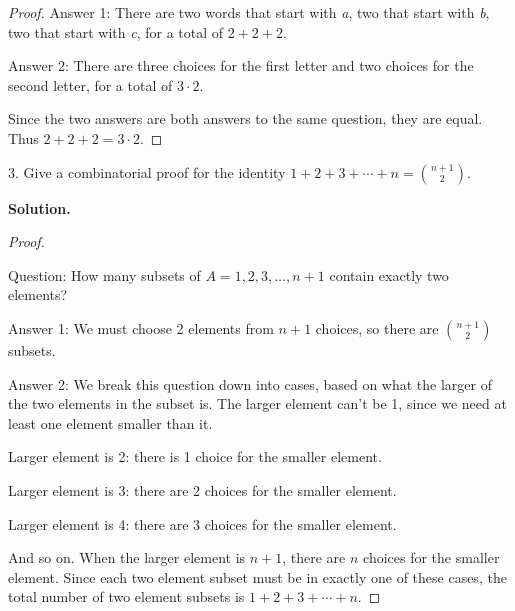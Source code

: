 \documentclass[10pt,]{book}
\theoremstyle{plain}
\theoremstyle{definition}
\theoremstyle{definition}
\theoremstyle{definition}
\numberwithin{equation}{section}
\begin{document}
\begin{exerciselist}
\begin{proof}
            Answer 1: There are two words that start with \emph{a}, two that start with \emph{b}, two that start with \emph{c}, for a total of \(2+2+2\).
\par

            Answer 2: There are three choices for the first letter and two choices for the second letter, for a total of \(3 \cdot 2\).
\par

            Since the two answers are both answers to the same question, they are equal. Thus \(2 + 2 + 2 = 3\cdot 2\).
\end{proof}
\item[3.]\hypertarget{exercise-74}{}
          Give a combinatorial proof for the identity \(1 + 2 + 3 + \cdots + n = {n+1 \choose 2}\).
\par\smallskip
\par\smallskip
\noindent\textbf{Solution.}\hypertarget{solution-111}{}\quad
\begin{proof}\hypertarget{proof-9}{}

            Question: How many subsets of \(A = {1,2,3, \ldots, n+1}\) contain exactly two elements?
\par

            Answer 1: We must choose 2 elements from \(n+1\) choices, so there are \({n+1 \choose 2}\) subsets.
\par

            Answer 2: We break this question down into cases, based on what the larger of the two elements in the subset is. The larger element can't be 1, since we need at least one element smaller than it.
\par

            Larger element is 2: there is 1 choice for the smaller element.
\par

            Larger element is 3: there are 2 choices for the smaller element.
\par

            Larger element is 4: there are 3 choices for the smaller element.
\par

            And so on. When the larger element is \(n+1\), there are \(n\) choices for the smaller element. Since each two element subset must be in exactly one of these cases, the total number of two element subsets is \(1 + 2 + 3 + \cdots + n\).
\par


\end{proof}
\end{exerciselist}
\end{document}

